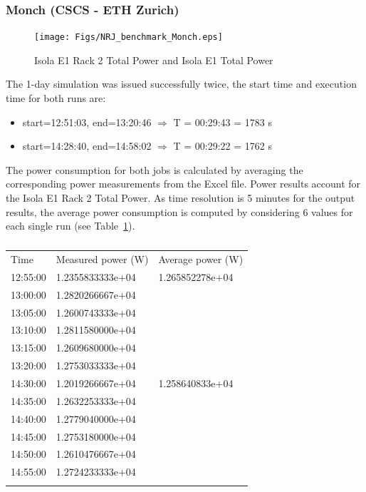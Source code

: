 \subsubsection{Monch (CSCS - ETH Zurich)}
\begin{figure}
  \texttt{[image: Figs/NRJ\_benchmark\_Monch.eps]}
  \caption{Isola E1 Rack 2 Total Power and Isola E1 Total Power}
  \label{fig:1}
\end{figure}

The 1-day simulation was issued successfully twice, the start time and
execution time for both runs are:
\begin{itemize}
\item start=12:51:03, end=13:20:46 $\Rightarrow$ T = 00:29:43 = 1783 s
\item start=14:28:40, end=14:58:02 $\Rightarrow$ T = 00:29:22 = 1762 s
\end{itemize}

The power  consumption for  both jobs is  calculated by  averaging the
corresponding power  measurements from the Excel  file.  Power results
account for the  Isola E1 Rack 2 Total Power. As  time resolution is 5
minutes  for the  output  results, the  average  power consumption  is
computed   by  considering  6   values  for   each  single   run  (see
Table~\ref{tab:1}).

\begin{table}
  \begin{center}
    \caption{}
    \label{tab:1}
    \begin{tabular}{lll}
      \hline\noalign{\smallskip}
      Time & Measured power (W) & Average power (W)  \\
      \noalign{\smallskip}\hline\noalign{\smallskip}
      12:55:00 & 1.2355833333e+04 & 1.265852278e+04 \\ 
      13:00:00 & 1.2820266667e+04 &  \\
      13:05:00 & 1.2600743333e+04 &  \\ 
      13:10:00 & 1.2811580000e+04 &  \\
      13:15:00 & 1.2609680000e+04 &  \\
      13:20:00 & 1.2753033333e+04 &  \\
      \noalign{\smallskip}\hline\noalign{\smallskip}
      14:30:00 & 1.2019266667e+04 & 1.258640833e+04 \\ 
      14:35:00 & 1.2632253333e+04 &  \\
      14:40:00 & 1.2779040000e+04 &  \\
      14:45:00 & 1.2753180000e+04 &  \\
      14:50:00 & 1.2610476667e+04 &  \\
      14:55:00 & 1.2724233333e+04 &  \\
      \noalign{\smallskip}\hline
    \end{tabular}
  \end{center}
\end{table}

